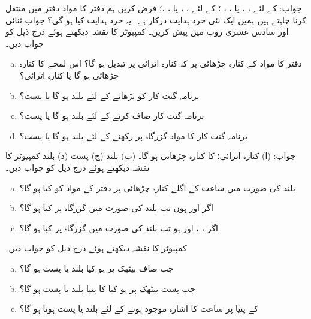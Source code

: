  جواب:
 کے لئے  ، ،   یا ، ، ؛
 کے لئے ، ،  یا ، ،؛
 فرض کریں ہم دفتر  کا مواد دفتر  میں منتقل کرنا چاہتے ہیں۔ہمیں ایک نئی  خرد ہدایت درکار ہے۔ یہ خرد ہدایت کیا ہو گی؟ جواب ثنائی اور  سادس عشری روپ میں پیش کریں۔
 کمپیوٹر کا نقشہ دیکھتے ہوئے درج ذیل کو جواب دیں۔
 \begin{enumerate}[a.]
 \item
دفتر  کا مواد   کے کنارہ چڑھائی پر کہ کنارہ اترائی پر تبدیل ہو گا؟
 اس لمحے  کا کنارہ چڑھائی ہو گا یا کنارہ اترائی؟
 \item
 برنامہ گنت کار کو بڑھانے کے لئے  بلند ہو گا یا پست؟
 \item
 برنامہ گنت کار صاف کرنے کے لئے  بلند ہو گا یا پست؟
 \item
 برنامہ گنت کار کا مواد  گزرگاہ  پر  رکھنے کے لئے  بلند ہو گا یا پست؟
 \end{enumerate}
 
 جواب: (ا) کنارہ اترائی؛  کا کنارہ چڑھائی ہو گا۔ (ب) بلند (ج) پست (د) بلند
  کمپیوٹر کا نقشہ دیکھتے ہوئے درج ذیل کو جواب دیں۔
 \begin{enumerate}[a.]
 \item
 بلند  کی صورت میں ساعت کے اگلے کنارہ چڑھائی پر  دفتر  کے مواد کو کیا ہو گا؟
 \item
 اگر  اور    ہوں تب بلند  کی صورت میں  گزرگاہ  پر کیا ہو گا؟
 \item
  اگر ،      ، اور  ہو  تب بلند  کی صورت میں  گزرگاہ  پر کیا ہو گا؟
 \end{enumerate}
  کمپیوٹر کا نقشہ دیکھتے ہوئے درج ذیل کو جواب دیں۔
  \begin{enumerate}[a.]
  \item
  جب  صاف بیٹھک پر ہو کیا  بلند یا پست ہو گا؟
  \item
  جب   پست بیٹھک پر   ہو کیا  کا پنیا  بلند یا پست ہو گا؟
  \item
   کے پنیا  پر ساعت  کا اشارہ موجود ہونے کے لئے  بلند یا پست ہونا ہو گا؟
  \end{enumerate}
  
